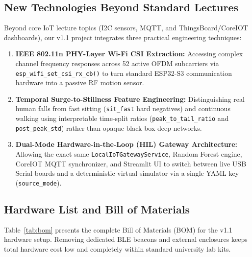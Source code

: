 \documentclass{hcmut-report}
\begin{document}
\subsection{New Technologies Beyond Standard Lectures}
Beyond core IoT lecture topics (I2C sensors, MQTT, and ThingsBoard/CoreIOT dashboards), our v1.1 project integrates three practical engineering techniques:
\begin{enumerate}
  \item \textbf{IEEE 802.11n PHY-Layer Wi-Fi CSI Extraction:} Accessing complex channel frequency responses across 52 active OFDM subcarriers via \texttt{esp\_wifi\_set\_csi\_rx\_cb()} to turn standard ESP32-S3 communication hardware into a passive RF motion sensor.
  \item \textbf{Temporal Surge-to-Stillness Feature Engineering:} Distinguishing real human falls from fast sitting (\texttt{sit\_fast} hard negatives) and continuous walking using interpretable time-split ratios (\texttt{peak\_to\_tail\_ratio} and \texttt{post\_peak\_std}) rather than opaque black-box deep networks.
  \item \textbf{Dual-Mode Hardware-in-the-Loop (HIL) Gateway Architecture:} Allowing the exact same \texttt{LocalIoTGatewayService}, Random Forest engine, CoreIOT MQTT synchronizer, and Streamlit UI to switch between live USB Serial boards and a deterministic virtual simulator via a single YAML key (\texttt{source\_mode}).
\end{enumerate}

\subsection{Hardware List and Bill of Materials}
Table~\ref{tab:bom} presents the complete Bill of Materials (BOM) for the v1.1 hardware setup. Removing dedicated BLE beacons and external enclosures keeps total hardware cost low and completely within standard university lab kits.
\end{document}
